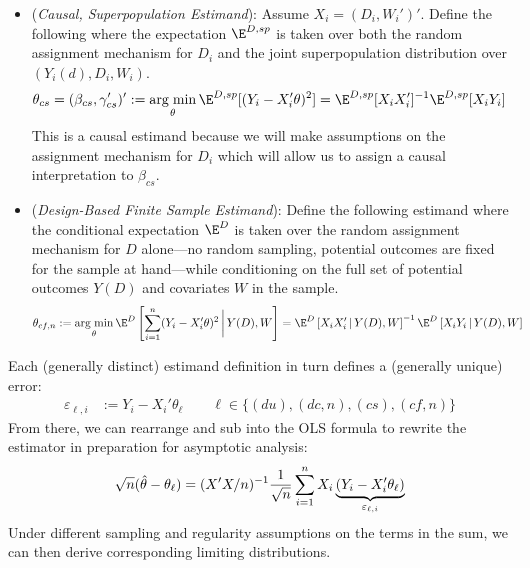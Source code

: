 \documentclass[12pt]{article}
\theoremstyle{plain}
\theoremstyle{definition}
\theoremstyle{remark}
\DeclareMathOperator*{\argmin}{arg\;min}
\newcommand{\sumin}{\sum^n_{i=1}}
\begin{document}
\begin{itemize}
  \item
    (\emph{Causal, Superpopulation Estimand}):
    Assume $X_i=(D_i,W_i')'$.
    Define the following where the expectation $\E^{D,sp}$ is taken over
    both the random assignment mechanism for $D_i$ and the joint
    superpopulation distribution over
    $(Y_i(d),D_i,W_i)$.
    \begin{align*}
      \theta_{cs}
      =
      (\beta_{cs},\gamma_{cs}')'
      &:=
      \argmin_{\theta}
      \E^{D,sp}[(Y_i-X_i'\theta)^2]
      =
      \E^{D,sp}[X_iX_i']^{-1}
      \E^{D,sp}[X_iY_i]
    \end{align*}
    This is a causal estimand because we will make assumptions on the
    assignment mechanism for $D_i$ which will allow us to assign a
    causal interpretation to $\beta_{cs}$.

  \clearpage
  \item
    (\emph{Design-Based Finite Sample Estimand}):
    Define the following estimand where the conditional expectation
    $\E^D$ is taken over the random assignment mechanism for $D$
    alone---no random sampling, potential outcomes are fixed for the
    sample at hand---while conditioning on the full set of potential
    outcomes $Y(D)$ and covariates $W$ in the sample.
    \begin{align*}
      \theta_{cf,n}
      &:=
      \argmin_{\theta}
      \E^D\left[
        \sum_{i=1}^n
        (Y_i-X_i'\theta)^2
        \,\bigg|\,Y(D),W
      \right]
      =
      \E^D
      \left[
      {X}_i{X}_i'
      \,|\,
      Y(D),W
      \right]^{-1}
      \E^D
      \left[
      {X}_iY_i
      \,|\,
      Y(D),W
      \right]
    \end{align*}
\end{itemize}
Each (generally distinct) estimand definition in turn defines a
(generally unique) error:
\begin{align*}
  \varepsilon_{\ell,i}
  &:=
  Y_i-X_i'\theta_{\ell}
  \qquad
  \ell\in\{(du), (dc,n), (cs), (cf,n)\}
\end{align*}
From there, we can rearrange and sub into the OLS formula to rewrite the
estimator in preparation for asymptotic analysis:
\begin{align*}
  \sqrt{n}
  (
  \hat{\theta}
  -
  \theta_{\ell}
  )
  =
  (X'X/n)^{-1}
  \frac{1}{\sqrt{n}}
  \sumin
  X_i
  \underbrace{%
    (Y_i-X_i'\theta_{\ell})
  }_{\varepsilon_{\ell,i}}
\end{align*}
Under different sampling and regularity assumptions on the terms in the
sum, we can then derive corresponding limiting distributions.
\end{document}

